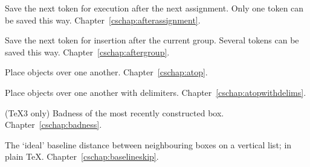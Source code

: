 \begin{glossinventory}
\item [\cs{afterassignment\gr{token}}]
      Save the next token for execution after the next assignment.
      Only one token can be saved this way.
Chapter~\ref{cschap:afterassignment}.

\item [\cs{aftergroup\gr{token}}]
      Save the next token for insertion after the current group.
      Several tokens can be saved this way.
Chapter~\ref{cschap:aftergroup}.

\item [\cs{atop\gr{dimen}}]
      Place objects over one another.
Chapter~\ref{cschap:atop}.

\item [\cs{atopwithdelims\gr{delim$_1$}\gr{delim$_2$}}]
      Place objects over one another with delimiters.
Chapter~\ref{cschap:atopwithdelims}.

\item [\cs{badness}]
      (\TeX3 only) 
      Badness of the most recently constructed box.
Chapter~\ref{cschap:badness}.

\item [\cs{baselineskip}]
      The `ideal' baseline distance between neighbouring 
      boxes on a vertical list;  \n{12pt} in plain \TeX.
Chapter~\ref{cschap:baselineskip}.


\end{glossinventory}
